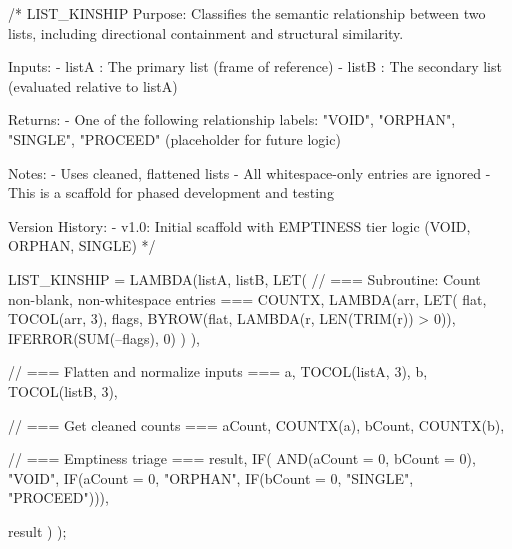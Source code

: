 /* LIST_KINSHIP
   Purpose:
   Classifies the semantic relationship between two lists, including directional containment and structural similarity.

   Inputs:
   - listA : The primary list (frame of reference)
   - listB : The secondary list (evaluated relative to listA)

   Returns:
   - One of the following relationship labels:
     "VOID", "ORPHAN", "SINGLE", "PROCEED" (placeholder for future logic)

   Notes:
   - Uses cleaned, flattened lists
   - All whitespace-only entries are ignored
   - This is a scaffold for phased development and testing

   Version History:
   - v1.0: Initial scaffold with EMPTINESS tier logic (VOID, ORPHAN, SINGLE)
*/

LIST_KINSHIP = LAMBDA(listA, listB,
  LET(
    // === Subroutine: Count non-blank, non-whitespace entries ===
    COUNTX, LAMBDA(arr,
      LET(
        flat, TOCOL(arr, 3),
        flags, BYROW(flat, LAMBDA(r, LEN(TRIM(r)) > 0)),
        IFERROR(SUM(--flags), 0)
      )
    ),

    // === Flatten and normalize inputs ===
    a, TOCOL(listA, 3),
    b, TOCOL(listB, 3),

    // === Get cleaned counts ===
    aCount, COUNTX(a),
    bCount, COUNTX(b),

    // === Emptiness triage ===
    result, IF(
      AND(aCount = 0, bCount = 0), "VOID",
      IF(aCount = 0, "ORPHAN",
      IF(bCount = 0, "SINGLE",
      "PROCEED"))),

    result
  )
);



